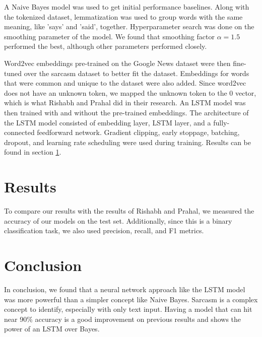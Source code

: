 \documentclass[11pt]{article}
\begin{document}
A Naive Bayes model was used to get initial performance baselines.
Along with the tokenized dataset,
lemmatization was used to group words with the same meaning,
like 'says' and 'said', together.
Hyperparameter search was done on the smoothing parameter of the model.
We found that smoothing factor $ \alpha = 1.5 $ performed the best, 
although other parameters performed closely.

Word2vec embeddings pre-trained on the Google News dataset
were then fine-tuned over the sarcasm dataset to better fit the dataset. \cite{google-word2vec}
Embeddings for words that were common and unique to the dataset were also added.
Since word2vec does not have an unknown token,
we mapped the unknown token to the 0 vector,
which is what Rishabh and Prahal did in their research. \cite{misra2023Sarcasm}
An LSTM model was then trained with and without the pre-trained embeddings.
The architecture of the LSTM model consisted of
embedding layer, LSTM layer, and a fully-connected feedforward network.
Gradient clipping, early stoppage, batching, dropout,
and learning rate scheduling were used during training. 
Results can be found in section \ref{sec:res}.


\section{Results}\label{sec:res}

To compare our results with the results of Rishabh and Prahal,
we measured the accuracy of our models on the test set. \cite{misra2023Sarcasm}
Additionally, since this is a binary classification task,
we also used precision, recall, and F1 metrics.




\section{Conclusion}

In conclusion, we found that a neural network approach like the LSTM model was more powerful than a simpler concept like Naive Bayes. Sarcasm is a complex concept to identify, especially with only text input. Having a model that can hit near 90\% accuracy is a good improvement on previous results and shows the power of an LSTM over Bayes.
\end{document}
